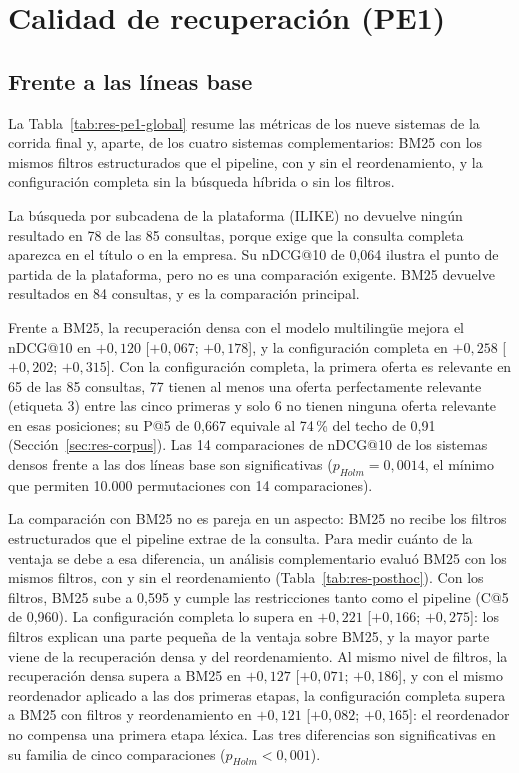 \section{Calidad de recuperación (PE1)}
\label{sec:res-pe1}

\subsection{Frente a las líneas base}

La Tabla~\ref{tab:res-pe1-global} resume las métricas de los nueve sistemas de la corrida final y, aparte, de los cuatro sistemas complementarios: BM25 con los mismos filtros estructurados que el pipeline, con y sin el reordenamiento, y la configuración completa sin la búsqueda híbrida o sin los filtros.



La búsqueda por subcadena de la plataforma (ILIKE) no devuelve ningún resultado en 78 de las 85 consultas, porque exige que la consulta completa aparezca en el título o en la empresa. Su nDCG@10 de 0,064 ilustra el punto de partida de la plataforma, pero no es una comparación exigente. BM25 devuelve resultados en 84 consultas, y es la comparación principal.

Frente a BM25, la recuperación densa con el modelo multilingüe mejora el nDCG@10 en $+0{,}120$ [$+0{,}067$; $+0{,}178$], y la configuración completa en $+0{,}258$ [$+0{,}202$; $+0{,}315$]. Con la configuración completa, la primera oferta es relevante en 65 de las 85 consultas, 77 tienen al menos una oferta perfectamente relevante (etiqueta 3) entre las cinco primeras y solo 6 no tienen ninguna oferta relevante en esas posiciones; su P@5 de 0,667 equivale al 74\,\% del techo de 0,91 (Sección~\ref{sec:res-corpus}). Las 14 comparaciones de nDCG@10 de los sistemas densos frente a las dos líneas base son significativas ($p_{Holm} = 0{,}0014$, el mínimo que permiten 10.000 permutaciones con 14 comparaciones).

La comparación con BM25 no es pareja en un aspecto: BM25 no recibe los filtros estructurados que el pipeline extrae de la consulta. Para medir cuánto de la ventaja se debe a esa diferencia, un análisis complementario evaluó BM25 con los mismos filtros, con y sin el reordenamiento (Tabla~\ref{tab:res-posthoc}). Con los filtros, BM25 sube a 0,595 y cumple las restricciones tanto como el pipeline (C@5 de 0,960). La configuración completa lo supera en $+0{,}221$ [$+0{,}166$; $+0{,}275$]: los filtros explican una parte pequeña de la ventaja sobre BM25, y la mayor parte viene de la recuperación densa y del reordenamiento. Al mismo nivel de filtros, la recuperación densa supera a BM25 en $+0{,}127$ [$+0{,}071$; $+0{,}186$], y con el mismo reordenador aplicado a las dos primeras etapas, la configuración completa supera a BM25 con filtros y reordenamiento en $+0{,}121$ [$+0{,}082$; $+0{,}165$]: el reordenador no compensa una primera etapa léxica. Las tres diferencias son significativas en su familia de cinco comparaciones ($p_{Holm} < 0{,}001$).


